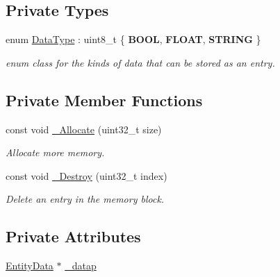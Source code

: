 \subsection*{Private Types}
\begin{DoxyCompactItemize}
\item 
enum \hyperlink{class_ensum_1_1_components_1_1_data_manager_aad73f648c4aee3f0530463eb787a7d7c}{Data\+Type} \+: uint8\+\_\+t \{ {\bfseries B\+O\+OL}, 
{\bfseries F\+L\+O\+AT}, 
{\bfseries S\+T\+R\+I\+NG}
 \}\hypertarget{class_ensum_1_1_components_1_1_data_manager_aad73f648c4aee3f0530463eb787a7d7c}{}\label{class_ensum_1_1_components_1_1_data_manager_aad73f648c4aee3f0530463eb787a7d7c}
\begin{DoxyCompactList}\small\item\em enum class for the kinds of data that can be stored as an entry. \end{DoxyCompactList}
\end{DoxyCompactItemize}
\subsection*{Private Member Functions}
\begin{DoxyCompactItemize}
\item 
const void \hyperlink{class_ensum_1_1_components_1_1_data_manager_aa9f344da59b7fda790b79a9e453ba7c4}{\+\_\+\+Allocate} (uint32\+\_\+t size)
\begin{DoxyCompactList}\small\item\em Allocate more memory. \end{DoxyCompactList}\item 
const void \hyperlink{class_ensum_1_1_components_1_1_data_manager_a6f5c2ed92eba2cb4d5c15c451cbf089c}{\+\_\+\+Destroy} (uint32\+\_\+t index)
\begin{DoxyCompactList}\small\item\em Delete an entry in the memory block. \end{DoxyCompactList}\end{DoxyCompactItemize}
\subsection*{Private Attributes}
\begin{DoxyCompactItemize}
\item 
\hyperlink{struct_ensum_1_1_components_1_1_data_manager_1_1_entity_data}{Entity\+Data} $\ast$ \hyperlink{class_ensum_1_1_components_1_1_data_manager_a03fb52e21fcfdf08e9dd11a71da74385}{\+\_\+datap}
\end{DoxyCompactItemize}

